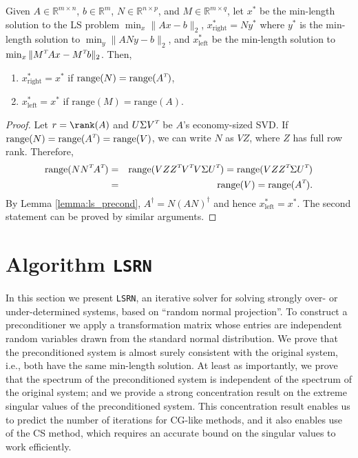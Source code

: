 \documentclass{siamltex}
\newcommand{\T}{^{\raisebox{0.09em}{\hbox{\tiny $T$}}\hspace{-0.1em}}}
\begin{document}
\begin{theorem}
  \label{thm:ls_precond_sufficient}
  Given $A \in \mathbb{R}^{m \times n}$, $b \in \mathbb{R}^m$, $N \in
  \mathbb{R}^{n \times p}$, and $M \in \mathbb{R}^{m \times q}$, let $x^*$ be
  the min-length solution to the LS problem $\min_x \| A x - b \|_2$,
  $x_{\text{right}}^* = N y^*$ where $y^*$ is the min-length solution to $\min_y
  \| A N y - b \|_2$, and $x_{\text{left}}^*$ be the min-length solution to
  $\min_x \| M\T A x - M\T b \|_2$.  Then,
  \begin{enumerate}
  \item $x_{\text{right}}^* = x^*$ if $\text{range}(N) = \text{range}(A\T)$,
  \item $x_{\text{left}}^* = x^*$ if $\text{range}(M) = \text{range}(A)$.
  \end{enumerate} 
\end{theorem}

\begin{proof} 
  Let $r = \rank(A)$ and $U \Sigma V\T$ be $A$'s economy-sized SVD. If
  $\text{range}(N) = \text{range}(A\T) = \text{range}(V)$, we can write $N$ as
  $V Z$, where $Z$ has full row rank. Therefore,
  \begin{eqnarray*}
    \text{range}( N N\T A\T ) &=& \text{range}( V Z Z\T V\T V \Sigma U\T ) = \text{range}( V Z Z\T \Sigma U\T ) \\
    &=& \text{range}( V ) = \text{range}(A\T).
  \end{eqnarray*}
  By Lemma \ref{lemma:ls_precond}, $A^\dagger = N ( A N )^\dagger$ and hence
  $x_{\text{left}}^* = x^*$. The second statement can be proved by similar
  arguments.
\end{proof}


\section{Algorithm \texttt{LSRN}}
\label{sec:prec-via-rand}

In this section we present \texttt{LSRN}, an iterative solver for
solving strongly over- or under-determined systems, based on ``random
normal projection''.  To construct a preconditioner we apply a
transformation matrix whose entries are independent random variables
drawn from the standard normal distribution.  We prove that the
preconditioned system is almost surely consistent with the original
system, i.e., both have the same min-length solution.  At least as
importantly, we prove that the spectrum of the preconditioned system
is independent of the spectrum of the original system; and we provide
a strong concentration result on the extreme singular values of the
preconditioned system.  This concentration result enables us to
predict the number of iterations for CG-like methods, and it also
enables use of the CS method, which requires an accurate bound on the
singular values to work efficiently.
\end{document}
